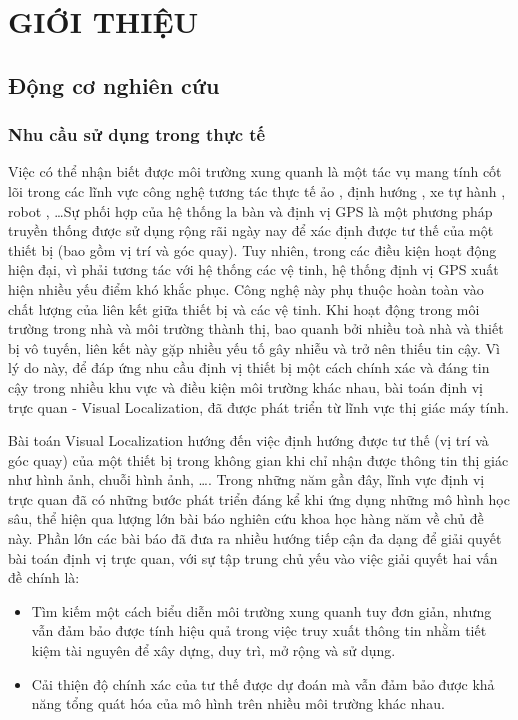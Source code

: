\chapter{GIỚI THIỆU}

\section{Động cơ nghiên cứu}

\subsection{Nhu cầu sử dụng trong thực tế}

Việc có thể nhận biết được môi trường xung quanh là một tác vụ mang tính cốt lõi trong các lĩnh vực công nghệ tương tác thực tế ảo \cite{middelberg2014scalable}, định hướng \cite{sarlin2023orienternet}, xe tự hành \cite{chaabane2021end}, robot \cite{sunderhauf2015place}, \dots Sự phối hợp của hệ thống la bàn và định vị GPS là một phương pháp truyền thống được sử dụng rộng rãi ngày nay để xác định được tư thế của một thiết bị (bao gồm vị trí và góc quay). Tuy nhiên, trong các điều kiện hoạt động hiện đại, vì phải tương tác với hệ thống các vệ tinh, hệ thống định vị GPS xuất hiện nhiều yếu điểm khó khắc phục. Công nghệ này phụ thuộc hoàn toàn vào chất lượng của liên kết giữa thiết bị và các vệ tinh. Khi hoạt động trong môi trường trong nhà và môi trường thành thị, bao quanh bởi nhiều toà nhà và thiết bị vô tuyến, liên kết này gặp nhiều yếu tố gây nhiễu và trở nên thiếu tin cậy. Vì lý do này, để đáp ứng nhu cầu định vị thiết bị một cách chính xác và đáng tin cậy trong nhiều khu vực và điều kiện môi trường khác nhau, bài toán định vị trực quan - Visual Localization, đã được phát triển từ lĩnh vực thị giác máy tính.

Bài toán Visual Localization hướng đến việc định hướng được tư thế (vị trí và góc quay) của một thiết bị trong không gian khi chỉ nhận được thông tin thị giác như hình ảnh, chuỗi hình ảnh, \dots. Trong những năm gần đây, lĩnh vực định vị trực quan đã có những bước phát triển đáng kể khi ứng dụng những mô hình học sâu, thể hiện qua lượng lớn bài báo nghiên cứu khoa học hàng năm về chủ đề này. Phần lớn các bài báo đã đưa ra nhiều hướng tiếp cận đa dạng để giải quyết bài toán định vị trực quan, với sự tập trung chủ yếu vào việc giải quyết hai vấn đề chính là:
\begin{itemize}
  \item Tìm kiếm một cách biểu diễn môi trường xung quanh tuy đơn giản, nhưng vẫn đảm bảo được tính hiệu quả trong việc truy xuất thông tin nhằm tiết kiệm tài nguyên để xây dựng, duy trì, mở rộng và sử dụng.
  \item Cải thiện độ chính xác của tư thế được dự đoán mà vẫn đảm bảo được khả năng tổng quát hóa của mô hình trên nhiều môi trường khác nhau.
\end{itemize}

